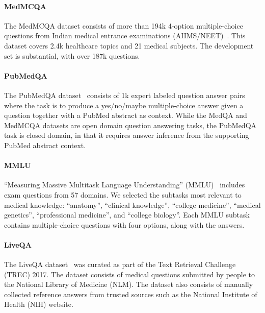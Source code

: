 \FloatBarrier

\paragraph{MedMCQA} The MedMCQA dataset consists of more than 194k 4-option multiple-choice questions from Indian medical entrance examinations (AIIMS/NEET)~\cite{pal2022medmcqa}. This dataset covers 2.4k healthcare topics and 21 medical subjects. The development set is substantial, with over 187k questions.

\FloatBarrier

\paragraph{PubMedQA} The PubMedQA dataset~\cite{jin2019pubmedqa} consists of 1k expert labeled question answer pairs where the task is to produce a yes/no/maybe multiple-choice answer given a question together with a PubMed abstract as context. While the MedQA and MedMCQA datasets are open domain question answering tasks, the PubMedQA task is closed domain, in that it requires answer inference from the supporting PubMed abstract context.

\FloatBarrier

\paragraph{MMLU} ``Measuring Massive Multitask Language Understanding'' (MMLU)~\cite{hendrycks2020measuring} includes exam questions from 57 domains. We selected the subtasks most relevant to medical knowledge: ``anatomy'', ``clinical knowledge'', ``college medicine'', ``medical genetics'', ``professional medicine'', and ``college biology''. Each MMLU subtask contains multiple-choice questions with four options, along with the answers. 

\FloatBarrier

\paragraph{LiveQA} The LiveQA dataset~\cite{abacha2017overview} was curated as part of the Text Retrieval Challenge (TREC) 2017. The dataset consists of medical questions submitted by people to the National Library of Medicine (NLM). The dataset also consists of manually collected reference answers from trusted sources such as the National Institute of Health (NIH) website.

\FloatBarrier

